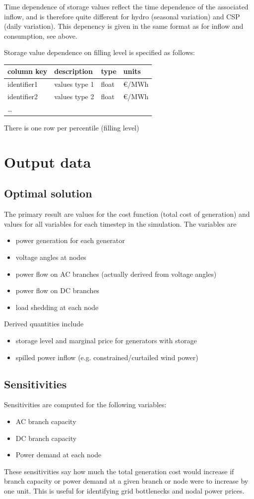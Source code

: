 \documentclass{article}
\begin{document}
Time dependence of storage values reflect the time dependence of the associated inflow, and is therefore quite different for hydro (seasonal variation) and CSP (daily variation). This depenency is given in the same format as for inflow and consumption, see above.

Storage value dependence on filling level is specified as follows:

\medskip
\begin{tabular}{llll}
	\hline
	column key 		& description & type & units \\
	\hline
	identifier1		& values type 1 	& float	& \euro/MWh \\
	identifier2		& values type 2	& float	& \euro/MWh \\
	\dots & & & \\
	\hline
\end{tabular}
\medskip

\noindent
There is one row per percentile (filling level)


\section{Output data}


\subsection{Optimal solution}
The primary result are values for the cost function (total cost of generation) and values for all variables for each timestep in the simulation. The variables are
\begin{itemize}
\item power generation for each generator
\item voltage angles at nodes
\item power flow on AC branches (actually derived from voltage angles)
\item power flow on DC branches 
\item load shedding at each node
\end{itemize}
Derived quantities include
\begin{itemize}
\item storage level and marginal price for generators with storage
\item spilled power inflow (e.g. constrained/curtailed wind power)
\end{itemize}


\subsection{Sensitivities}
Sensitivities are computed for the following variables:
\begin{itemize}
\item AC branch capacity
\item DC branch capacity
\item Power demand at each node
\end{itemize}
These sensitivities say how much the total generation cost would increase if branch capacity or power demand at a given branch or node were to increase by one unit. 
This is useful for identifying grid bottlenecks and nodal power prices.
\end{document}
